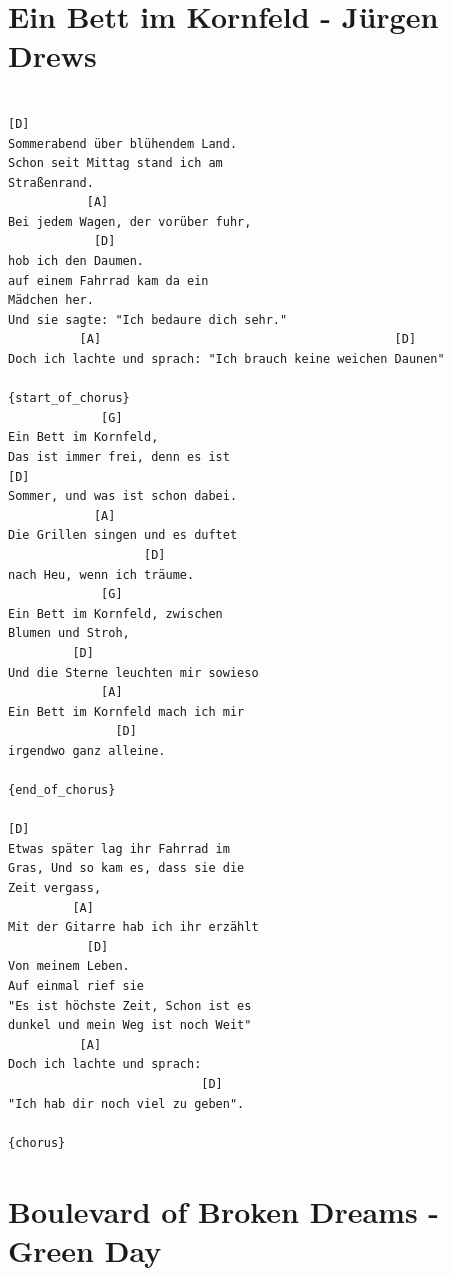 \documentclass[
]{book}
\let\stdsection\section
\renewcommand\section{\clearpage\stdsection}
\begin{document}
\hypertarget{ein-bett-im-kornfeld---juxfcrgen-drews}{%
\section{Ein Bett im Kornfeld - Jürgen Drews}\label{ein-bett-im-kornfeld---juxfcrgen-drews}}

\begin{verbatim}

[D]
Sommerabend über blühendem Land.
Schon seit Mittag stand ich am 
Straßenrand.
           [A]
Bei jedem Wagen, der vorüber fuhr,
            [D]
hob ich den Daumen.
auf einem Fahrrad kam da ein 
Mädchen her.
Und sie sagte: "Ich bedaure dich sehr."
          [A]                                         [D]
Doch ich lachte und sprach: "Ich brauch keine weichen Daunen"

{start_of_chorus}
             [G]
Ein Bett im Kornfeld,
Das ist immer frei, denn es ist
[D]
Sommer, und was ist schon dabei.
            [A]
Die Grillen singen und es duftet 
                   [D]
nach Heu, wenn ich träume.
             [G]
Ein Bett im Kornfeld, zwischen 
Blumen und Stroh,
         [D]
Und die Sterne leuchten mir sowieso
             [A]
Ein Bett im Kornfeld mach ich mir 
               [D]
irgendwo ganz alleine.

{end_of_chorus}

[D]
Etwas später lag ihr Fahrrad im 
Gras, Und so kam es, dass sie die 
Zeit vergass,
         [A]
Mit der Gitarre hab ich ihr erzählt
           [D]
Von meinem Leben.
Auf einmal rief sie
"Es ist höchste Zeit, Schon ist es 
dunkel und mein Weg ist noch Weit"
          [A]
Doch ich lachte und sprach:
                           [D]
"Ich hab dir noch viel zu geben".

{chorus}

\end{verbatim}

\hypertarget{boulevard-of-broken-dreams---green-day}{%
\section{Boulevard of Broken Dreams - Green Day}\label{boulevard-of-broken-dreams---green-day}}
\end{document}
